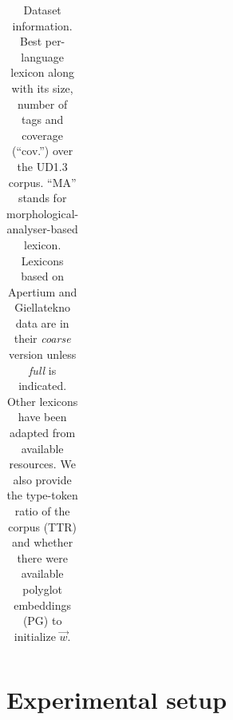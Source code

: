 \documentclass[11pt,letterpaper]{article}
\begin{document}
\begin{table}[t]
\begin{tabular}{llrrr|rr}

\bottomrule
\end{tabular}
\caption{Dataset information. Best per-language lexicon along with its size, number of tags and coverage (``cov.'') over the UD1.3
  corpus. ``MA'' stands for morphological-analyser-based lexicon. Lexicons based on Apertium and Giellatekno
  data are in their {\em coarse} version unless {\em full} is indicated. Other lexicons
  have been adapted from available resources.\footnotemark{} We also provide the type-token ratio of the 
  corpus (TTR) and whether there were available polyglot embeddings (PG) to initialize $\vec{w}$.}\label{tbl:lex}
\end{table}


\section{Experimental setup}
\end{document}
